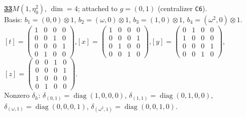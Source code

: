 \begin{samepage}\noindent\textbf{\underline{33}}\quad $M(1,\eta^{2}_{0})$, $\dim=4$; attached to $g=(0,1)$ (centralizer \texttt{C6}).\\
Basis: $b_{1}=(0,0)\otimes 1$, $b_{2}=(\omega,0)\otimes 1$, $b_{3}=(1,0)\otimes 1$, $b_{4}=(\omega^2,0)\otimes 1$.\\
$[t]=\left(\begin{smallmatrix} 1 & 0 & 0 & 0 \\ 0 & 0 & 1 & 0 \\ 0 & 0 & 0 & 1 \\ 0 & 1 & 0 & 0 \end{smallmatrix}\right)$,\quad $[x]=\left(\begin{smallmatrix} 1 & 0 & 0 & 0 \\ 0 & 0 & 0 & 1 \\ 0 & 1 & 0 & 0 \\ 0 & 0 & 1 & 0 \end{smallmatrix}\right)$,\quad $[y]=\left(\begin{smallmatrix} 0 & 1 & 0 & 0 \\ 1 & 0 & 0 & 0 \\ 0 & 0 & 0 & 1 \\ 0 & 0 & 1 & 0 \end{smallmatrix}\right)$,\quad $[z]=\left(\begin{smallmatrix} 0 & 0 & 1 & 0 \\ 0 & 0 & 0 & 1 \\ 1 & 0 & 0 & 0 \\ 0 & 1 & 0 & 0 \end{smallmatrix}\right)$.\\
Nonzero $\delta_h$: $\delta_{(0,1)}=\operatorname{diag}(1,0,0,0)$, $\delta_{(1,1)}=\operatorname{diag}(0,1,0,0)$, $\delta_{(\omega,1)}=\operatorname{diag}(0,0,0,1)$, $\delta_{(\omega^2,1)}=\operatorname{diag}(0,0,1,0)$.\end{samepage}
\medskip

